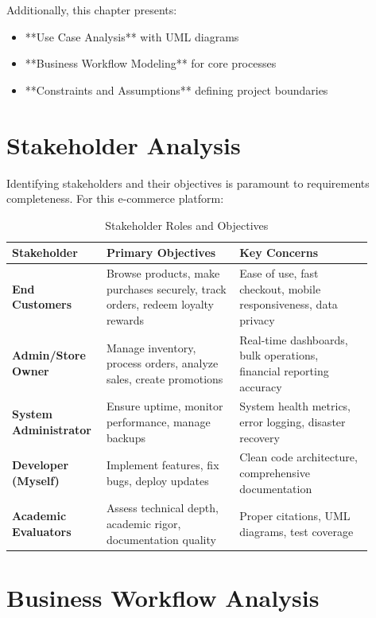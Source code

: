 \documentclass[12pt, a4paper]{report}
\begin{document}
Additionally, this chapter presents:
\begin{itemize}
    \item **Use Case Analysis** with UML diagrams
    \item **Business Workflow Modeling** for core processes
    \item **Constraints and Assumptions** defining project boundaries
\end{itemize}

\section{Stakeholder Analysis}

Identifying stakeholders and their objectives is paramount to requirements completeness. For this e-commerce platform:

\begin{table}[H]
\centering
\caption{Stakeholder Roles and Objectives}
\label{tab:stakeholders}
\begin{tabular}{@{}p{0.20\linewidth}p{0.35\linewidth}p{0.35\linewidth}@{}}
\toprule
\textbf{Stakeholder} & \textbf{Primary Objectives} & \textbf{Key Concerns} \\
\midrule
\textbf{End Customers} & Browse products, make purchases securely, track orders, redeem loyalty rewards & Ease of use, fast checkout, mobile responsiveness, data privacy \\
\textbf{Admin/Store Owner} & Manage inventory, process orders, analyze sales, create promotions & Real-time dashboards, bulk operations, financial reporting accuracy \\
\textbf{System Administrator} & Ensure uptime, monitor performance, manage backups & System health metrics, error logging, disaster recovery \\
\textbf{Developer (Myself)} & Implement features, fix bugs, deploy updates & Clean code architecture, comprehensive documentation \\
\textbf{Academic Evaluators} & Assess technical depth, academic rigor, documentation quality & Proper citations, UML diagrams, test coverage \\
\bottomrule
\end{tabular}
\end{table}

\section{Business Workflow Analysis}
\end{document}
